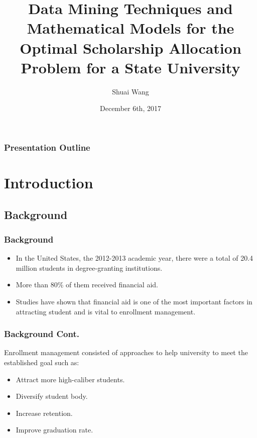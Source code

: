 \documentclass[aspectratio=169]{beamer}
\title{Data Mining Techniques and Mathematical Models for
the Optimal Scholarship Allocation Problem for a State University}
\author{Shuai Wang} %
\institute{Wright State University \\

	Department of Biomedical, Industrial, and Human Factors Engineering}
\date{December 6th, 2017}
\begin{document}
\begin{frame}
        \titlepage
       
\end{frame}


\begin{frame}
    \frametitle{Presentation Outline}
    
 \tableofcontents
\end{frame}


\section{Introduction}  

\subsection{Background}
\begin{frame}
    \frametitle{Background}
\begin{itemize}
\item In the United States, the 2012-2013 academic year, there were a total 
of 20.4 million students in degree-granting institutions.
\item More than 80\% of them received financial aid.

\item Studies have shown that financial aid is one of the most important
factors in attracting student and is vital to enrollment management.
\end{itemize}
\end{frame}

\begin{frame}
	\frametitle{Background Cont.}
    Enrollment management consisted of approaches to help university
to meet the established goal such as:
   \begin{itemize}
   \item Attract more high-caliber students.
   \item Diversify student body.
   \item Increase retention.
   \item Improve graduation rate.
   \end{itemize} 

\end{frame}
\end{document}
